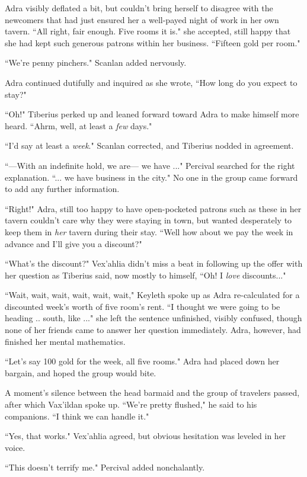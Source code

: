 Adra visibly deflated a bit, but couldn't bring herself to disagree with the newcomers that had just ensured her a well-payed night of work in her own tavern. ``All right, fair enough. Five rooms it is." she accepted, still happy that she had kept such generous patrons within her business. ``Fifteen gold per room." 

``We're penny pinchers." Scanlan added nervously.

Adra continued dutifully and inquired as she wrote, ``How long do you expect to stay?"

``Oh!" Tiberius perked up and leaned forward toward Adra to make himself more heard. ``Ahrm, well, at least a \textit{few} days."

``I'd say at least a \textit{week}." Scanlan corrected, and Tiberius nodded in agreement.

``---With an indefinite hold, we are--- we have ..." Percival searched for the right explanation. ``... we have business in the city." No one in the group came forward to add any further information.

``Right!" Adra, still too happy to have open-pocketed patrons such as these in her tavern couldn't care why they were staying in town, but wanted desperately to keep them in \textit{her} tavern during their stay. ``Well how about we pay the week in advance and I'll give you a discount?"

``What's the discount?" Vex'ahlia didn't miss a beat in following up the offer with her question as Tiberius said, now mostly to himself, ``Oh! I \textit{love} discounts..."

``Wait, wait, wait, wait, wait, wait," Keyleth spoke up as Adra re-calculated for a discounted week's worth of five room's rent. ``I thought we were going to be heading .. south, like ..." she left the sentence unfinished, visibly confused, though none of her friends came to answer her question immediately. Adra, however, had finished her mental mathematics.

``Let's say 100 gold for the week, all five rooms." Adra had placed down her bargain, and hoped the group would bite.

A moment's silence between the head barmaid and the group of travelers passed, after which Vax'ildan spoke up. ``We're pretty flushed," he said to his companions. ``I think we can handle it."

``Yes, that works." Vex'ahlia agreed, but obvious hesitation was leveled in her voice.

``This doesn't terrify me." Percival added nonchalantly.

